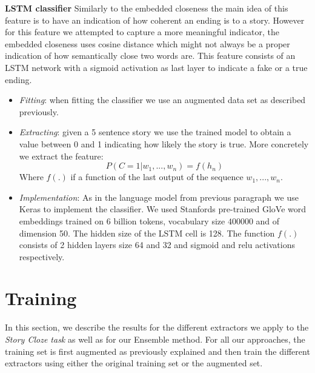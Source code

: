 \documentclass{article}
\begin{document}
\textbf{LSTM classifier} Similarly to the embedded closeness the main idea of this feature is to have an indication of how coherent an ending is to a story. However for this feature we attempted to capture a more meaningful indicator, the embedded closeness uses cosine distance which might not always be a proper indication of how semantically close two words are. This feature consists of an LSTM network with a sigmoid activation as last layer to indicate a fake or a true ending.
\begin{itemize}
	\item \textit{Fitting}: when fitting the classifier we use an augmented data set as described previously.
	\item \textit{Extracting}: given a 5 sentence story we use the trained model to obtain a value between 0 and 1 indicating how likely the story is true. More concretely we extract the feature:
	\begin{equation}
		P(C = 1| w_1,...,w_n) = f(h_n)
	\end{equation}
	Where $f(.)$ if a function of the last output of the sequence $w_1,...,w_n$.
	\item \textit{Implementation}: As in the language model from previous paragraph we use Keras to implement the classifier. We used Stanfords pre-trained GloVe word embeddings trained on 6 billion tokens, vocabulary size $400000$ and of dimension 50. The hidden size of the LSTM cell is 128. The function $f(.)$ consists of 2 hidden layers size 64 and 32 and sigmoid and relu activations respectively.
\end{itemize}

\section{Training}
\label{sec:training}

In this section, we describe the results for the different extractors we apply
to the {\it Story Cloze task} as well as for our Ensemble method. For all our
approaches, the training set is first augmented as previously explained and then
train the different extractors using either the original training set or the augmented
set.
\end{document}
